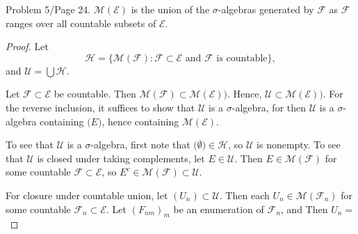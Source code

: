\documentclass{article}
\begin{document}
 Problem 5/Page 24. $\mathcal M( \mathcal E)$ is the union of the $\sigma$-algebras generated by $\mathcal F$ as $\mathcal F$ ranges over all countable subsets of $\mathcal E$.
\begin{proof}
Let $$\mathcal H =  \{ \mathcal M ( \mathcal F ) : \mathcal F \subset \mathcal E \text{ and } \mathcal F \text{ is countable} \},$$ and $\mathcal U = \bigcup \mathcal H$.


Let $\mathcal F \subset \mathcal E$ be countable. Then $\mathcal M (\mathcal F) \subset \mathcal M (\mathcal E))$.   Hence, $\mathcal U \subset \mathcal M ( \mathcal E))$. For the reverse inclusion, it suffices to show that $\mathcal U$ is a $\sigma$-algebra, for then $ \mathcal U$ is a $\sigma$-algebra containing $\mathcal(E)$, hence containing $\mathcal M(\mathcal E)$.  

To see that $\mathcal U$ is a $\sigma$-algebra, first note that $\mathcal(\emptyset) \in \mathcal H$, so $\mathcal U$ is nonempty. To see that $\mathcal U$ is closed under taking complements, let $E \in \mathcal U$.  Then $E \in \mathcal M ( \mathcal F )$ for some countable $\mathcal F \subset \mathcal E$, so $E^c \in \mathcal M ( \mathcal F) \subset \mathcal U$.  

For closure under countable union, let $(U_n) \subset \mathcal U$. Then each $U_n \in \mathcal M ( \mathcal F_n )$ for some countable $\mathcal F_n \subset \mathcal E$. Let $(F_{nm})_m$ be an enumeration of $\mathcal F_n$, and Then $U_n = $

\end{proof}
\end{document}
